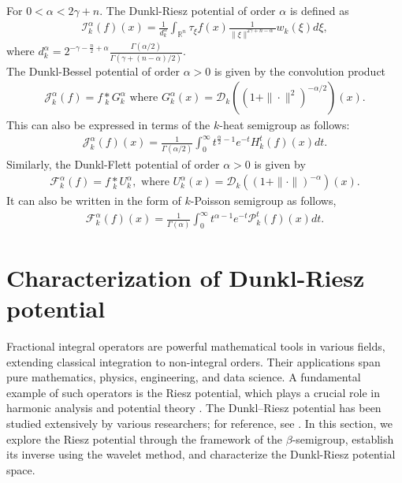 \documentclass[11pt,a4paper,reqno]{amsproc}
\theoremstyle{definition}
\theoremstyle{remark}
\numberwithin{equation}{section}
\begin{document}
 For $0< \alpha < 2\gamma+n$. The Dunkl-Riesz potential of order $\alpha$  \cite{Xu} is defined as  
\begin{align*}
    \mathcal{I}_k^{\alpha}(f)(x)= \frac{1}{d_k^{\alpha}}\int_{\mathbb{R}^n}\tau_{\xi}f(x) \frac{1}{\|\xi\|^{2\gamma+n-\alpha}} w_k(\xi)d\xi,
\end{align*} where $d_k^{\alpha}= 2^{-\gamma-\frac{n}{2}+\alpha} \frac{\Gamma(\alpha/2)}{\Gamma(\gamma+(n-\alpha)/2)}$.  \\
The Dunkl-Bessel potential of order $\alpha >0$  is given by the convolution product \cite{Ben} 
\begin{align*}
    \mathcal{J}_k^{\alpha}(f) = f \underset{k}{\ast} G_k^{\alpha} \text{ where } G_k^{\alpha}(x)=\mathcal{D}_k \left((1+\|\cdot\|^2)^{-\alpha/2}\right)(x).
\end{align*} This can also be expressed in terms of the $k$-heat semigroup as follows:
\begin{align*}
    \mathcal{J}_k^{\alpha}(f)(x)= \frac{1}{\Gamma(\alpha/2)} \int_0^{\infty} t^{\frac{\alpha}{2}-1} e^{-t} H_k^t(f)(x) dt.
\end{align*} Similarly,  the Dunkl-Flett potential of order $\alpha >0$  is given by 
\begin{align*}
    \mathcal{F}_k^{\alpha}(f) = f \underset{k}{\ast} U_k^{\alpha}, \text{ where } U_k^{\alpha}(x)=\mathcal{D}_k\left((1+\|\cdot\|)^{-\alpha}\right)(x).
\end{align*} It can also be written in the form of $k$-Poisson semigroup as follows,
\begin{align*}
    \mathcal{F}_k^{\alpha}(f)(x)= \frac{1}{\Gamma(\alpha)} \int_0^{\infty} t^{\alpha-1} e^{-t} \mathcal{P}_k^t(f)(x) dt.
\end{align*}


\section{Characterization of Dunkl-Riesz potential} \label{S:3}
Fractional integral operators are powerful mathematical tools in various fields, extending classical integration to non-integral orders. Their applications span pure mathematics, physics, engineering, and data science. A fundamental example of such operators is the Riesz potential, which plays a crucial role in harmonic analysis and potential theory \cite{Rubin-1996, Rubin-1998}. The Dunkl–Riesz potential has been studied extensively by various researchers; for reference, see \cite{Gallardo, Gorbachev-2021, Hassani}. 
In this section, we explore the Riesz potential through the framework of the $\beta$-semigroup, establish its inverse using the wavelet method, and characterize the Dunkl-Riesz potential space. 
\\
\end{document}
